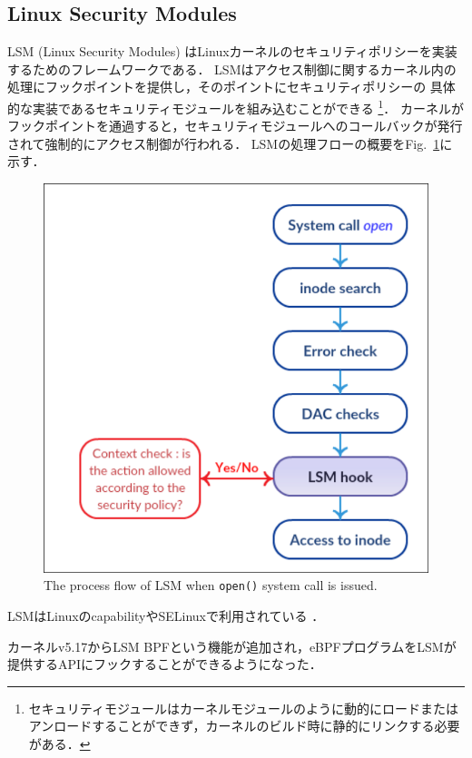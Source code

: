 \documentclass[platex,a4j,10pt,twoside,twocolumn,dvipdfmx]{jsarticle}
\newcommand{\Fref}[1]{Fig.~\ref{#1}}
\begin{document}
\subsection{Linux Security Modules}
LSM (Linux Security Modules) はLinuxカーネルのセキュリティポリシーを実装するためのフレームワークである．
LSMはアクセス制御に関するカーネル内の処理にフックポイントを提供し，そのポイントにセキュリティポリシーの
具体的な実装であるセキュリティモジュールを組み込むことができる
\footnote{セキュリティモジュールはカーネルモジュールのように動的にロードまたはアンロードすることができず，カーネルのビルド時に静的にリンクする必要がある．}．
カーネルがフックポイントを通過すると，セキュリティモジュールへのコールバックが発行されて強制的にアクセス制御が行われる．
LSMの処理フローの概要を\Fref{img:lsm-process}に示す．
\begin{figure}[tp]
  \begin{center}
    \includegraphics[width=\columnwidth]{./img/lsm-stack-hooks.png}
  \end{center}
  \caption{The process flow of LSM when \texttt{open()} system call is issued. \cite{LinuxSec12:online}}
  \label{img:lsm-process}
\end{figure}
LSMはLinuxのcapabilityやSELinuxで利用されている \cite{LinuxSec95:online}．

カーネルv5.17からLSM BPFという機能が追加され，eBPFプログラムをLSMが提供するAPIにフックすることができるようになった．
\end{document}
